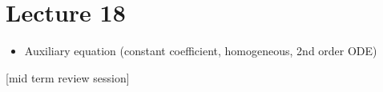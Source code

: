\chapter*{Lecture 18}
\begin{recall}{}{}
\begin{itemize}
\item Auxiliary equation (constant coefficient, homogeneous, 2nd order ODE)
\end{itemize}
\end{recall}


[mid term review session]